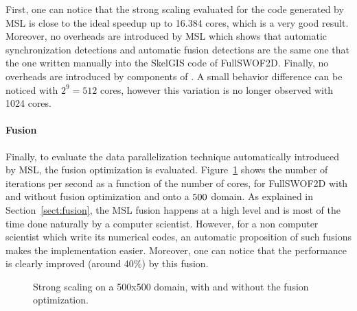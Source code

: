 First, one can notice that the strong scaling evaluated for the code generated by MSL is close to the ideal speedup up to 16.384 cores, which is a very good result. Moreover, no overheads are introduced by MSL which shows that automatic synchronization detections and automatic fusion detections are the same one that the one written manually into the SkelGIS code of FullSWOF2D. Finally, no overheads are introduced by components of \llc. A small behavior difference can be noticed with $2^9=512$ cores, however this variation is no longer observed with 1024 cores.

\paragraph{\textbf{Fusion}} Finally, to evaluate the data parallelization technique automatically introduced by MSL, the fusion optimization is evaluated. Figure~\ref{fig:fusion} shows the number of iterations per second as a function of the number of cores, for FullSWOF2D with and without fusion optimization and onto a $500 \time 500$ domain. As explained in Section~\ref{sect:fusion}, the MSL fusion happens at a high level and is most of the time done naturally by a computer scientist. However, for a non computer scientist which write its numerical codes, an automatic proposition of such fusions makes the implementation easier. Moreover, one can notice that the performance is clearly improved (around 40\%) by this fusion.

\begin{figure}[!h]\begin{center}
  \caption{Strong scaling on a 500x500 domain, with and without the fusion optimization.}
  \label{fig:fusion}
\end{center}\end{figure}


